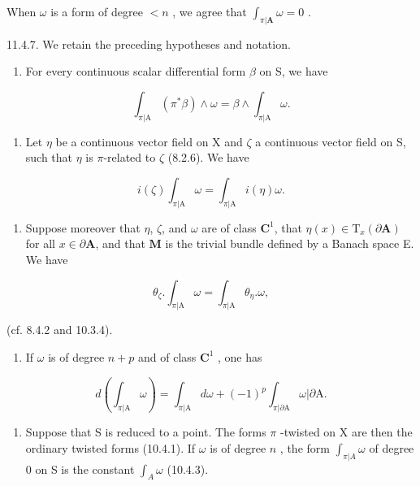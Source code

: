 When \(\omega\) is a form of degree \(< n\) , we agree that \(\int_{\pi|\mathbf{A}} \omega = 0\) .

11.4.7. We retain the preceding hypotheses and notation.

\begin{enumerate}
\def\labelenumi{\alph{enumi})}
\tightlist
\item
  For every continuous scalar differential form \(\beta\) on S, we have
\end{enumerate}

\[
\int_ {\pi | \mathrm{A}} (\pi^ {*} \beta) \wedge \omega = \beta \wedge \int_ {\pi | \mathrm{A}} \omega .
\]

\begin{enumerate}
\def\labelenumi{\alph{enumi})}
\setcounter{enumi}{1}
\tightlist
\item
  Let \(\eta\) be a continuous vector field on X and \(\zeta\) a continuous vector field on S, such that \(\eta\) is \(\pi\)-related to \(\zeta\) (8.2.6). We have
\end{enumerate}

\[
i (\zeta) \int_ {\pi | \mathrm{A}} \omega = \int_ {\pi | \mathrm{A}} i (\eta) \omega .
\]

\begin{enumerate}
\def\labelenumi{\alph{enumi})}
\setcounter{enumi}{2}
\tightlist
\item
  Suppose moreover that \(\eta\), \(\zeta\), and \(\omega\) are of class \(\mathbf{C}^1\), that \(\eta(x) \in \mathrm{T}_x(\partial \mathbf{A})\) for all \(x \in \partial \mathbf{A}\), and that \(\mathbf{M}\) is the trivial bundle defined by a Banach space E. We have
\end{enumerate}

\[
\theta_ {\zeta}. \int_ {\pi | \mathrm{A}} \omega = \int_ {\pi | \mathrm{A}} \theta_ {\eta}. \omega ,
\]

(cf. 8.4.2 and 10.3.4).

\begin{enumerate}
\def\labelenumi{\alph{enumi})}
\setcounter{enumi}{3}
\tightlist
\item
  If \(\omega\) is of degree \(n + p\) and of class \(\mathbf{C}^1\) , one has
\end{enumerate}

\[
d \left(\int_ {\pi | \mathrm{A}} \omega\right) = \int_ {\pi | \mathrm{A}} d \omega + (- 1) ^ {p} \int_ {\pi | \partial \mathrm{A}} \omega | \partial \mathrm{A}.
\]

\begin{enumerate}
\def\labelenumi{\alph{enumi})}
\setcounter{enumi}{4}
\tightlist
\item
  Suppose that S is reduced to a point. The forms \(\pi\) -twisted on X are then the ordinary twisted forms (10.4.1). If \(\omega\) is of degree \(n\) , the form \(\int_{\pi|A} \omega\) of degree 0 on S is the constant \(\int_{A} \omega\) (10.4.3).
\end{enumerate}

